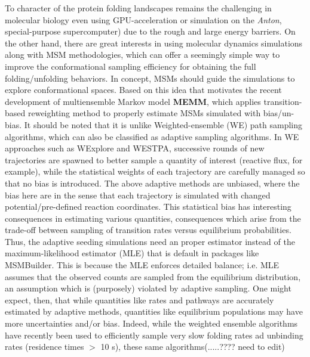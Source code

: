 \documentclass[%
 aip,
rsi,%
 amsmath,amssymb,
 reprint,%
]{revtex4-1}
\begin{document}
To character of the protein folding landscapes remains the challenging in molecular biology even using GPU-acceleration or simulation on the \textit{Anton}, special-purpose supercomputer) due to the rough and large energy barriers. On the other hand, there are great interests in using molecular dynamics simulations along with MSM methodologies, which can offer a seemingly simple way to improve the conformational sampling efficiency for obtaining the full folding/unfolding behaviors.\cite{Voelz:2014kk,Shamsi:2017jg,Zimmerman:2018jn} In concept, MSMs should guide the simulations to explore conformational spaces. Based on this idea that motivates the recent development of multiensemble Markov model \textbf{MEMM}, which applies transition-based reweighting method to properly estimate MSMs simulated with bias/un-bias.\cite{Wu:2016fk} It should be noted that it is unlike Weighted-ensemble (WE) path sampling algorithms, which can also be classified as adaptive sampling algorithms. In WE approaches such as WExplore\cite{Dickson:2014du} and WESTPA\cite{Zwier:2015fn}, successive rounds of new trajectories are spawned to better sample a quantity of interest (reactive flux, for example), while the statistical weights of each trajectory are carefully managed so that no bias is introduced. The above adaptive methods are unbiased, where the bias here are in the sense that each trajectory is simulated with changed potential/pre-defined reaction coordinates. This statistical bias has interesting consequences in estimating various quantities, consequences which arise from the trade-off between sampling of transition rates versus equilibrium probabilities.  Thus, the adaptive seeding simulations need an proper estimator instead of the maximum-likelihood estimator (MLE) that is default in packages like MSMBuilder.\cite{Pande:2010ik,Prinz:2011id,McGibbon:2015fv,Kellogg:2012cu,Metzner:2009jx,Nuske:2014kk} This is because the MLE enforces detailed balance; i.e. MLE assumes that the observed counts are sampled from the equilibrium distribution, an assumption which is (purposely) violated by adaptive sampling.  One might expect, then, that while quantities like rates and pathways are accurately estimated by adaptive methods, quantities like equilibrium populations may have more uncertainties and/or bias.  Indeed, while the weighted ensemble algorithms have recently been used to efficiently sample very slow folding rates \cite{Dickson:2016it} ad unbinding rates (residence times $>$ 10 s), these same algorithms(.....???? need to edit)
\end{document}
